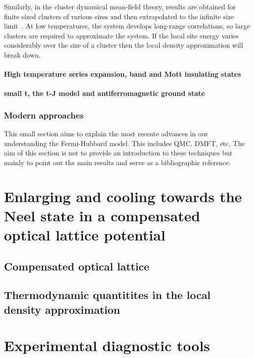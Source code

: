\documentclass[oneside,11pt]{memoir}
\begin{document}
Similarly, in the cluster dynamical mean-field theory, results are obtained for
finite sized clusters of various sizes and then extrapolated to the infinite
size limit~\cite{Fuchs2011}.  At low temperatures, the system develops
long-range correlations, so large clusters are required to approximate the
system.   If the local site energy varies considerably over the size of a
cluster then the local density approximation will break down.   





 
\subsubsection { High temperature series expansion, band and Mott insulating states  }
\subsubsection { small t, the t-J model and antiferromagnetic ground state}

\subsection{Modern approaches}  

This small section aims to explain the most recente advances in our
understanding the Fermi-Hubbard model.  This includes QMC, DMFT, etc.  The aim
of this section is not to provide an introduction to these techniques but
mainly to point out the main results and serve as a bibliographic reference.  


\chapter{Enlarging and cooling towards the Neel state in a compensated optical
lattice potential}

\section{Compensated optical lattice} 
\section{Thermodynamic quantitites in the local density approximation} 


\chapter{Experimental diagnostic tools} 
\end{document}
